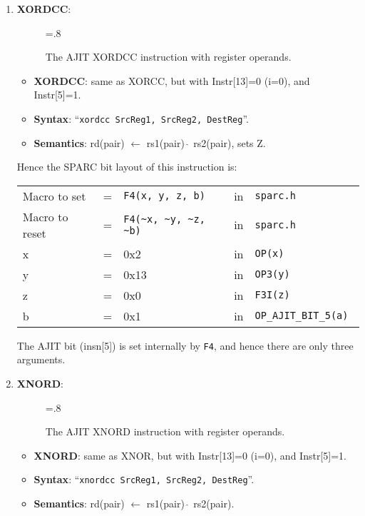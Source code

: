 \begin{enumerate}
\item \textbf{XORDCC}:\\
  \begin{center}
    \begin{figure}[h]
      \centering
      \epsfxsize=.8\linewidth
      \caption{The AJIT XORDCC instruction  with register operands.}
      \label{fig:ajit:xordcc:insn}
    \end{figure}
  \end{center}
  \begin{itemize}
  \item []\textbf{XORDCC}: same as XORCC, but with Instr[13]=0 (i=0), and
    Instr[5]=1.
  \item []\textbf{Syntax}: ``\texttt{xordcc  SrcReg1, SrcReg2, DestReg}''.
  \item []\textbf{Semantics}: rd(pair) $\leftarrow$ rs1(pair) $\hat{~}$
    rs2(pair), sets Z.
  \end{itemize}

  Hence the SPARC bit layout of this instruction is:

  \begin{tabular}[h]{lclcl}
    Macro to set   &=&  \verb|F4(x, y, z, b)|     &in& \verb|sparc.h|     \\
    Macro to reset &=&  \verb|F4(~x, ~y, ~z, ~b)| &in& \verb|sparc.h|     \\
    x              &=& 0x2                        &in& \verb|OP(x) | \\
    y              &=& 0x13                       &in& \verb|OP3(y) | \\
    z              &=& 0x0                        &in& \verb|F3I(z) | \\
    b              &=& 0x1                        &in& \verb|OP_AJIT_BIT_5(a) |
  \end{tabular}

  The AJIT bit  (insn[5]) is set internally by  \texttt{F4}, and hence
  there are only three arguments.

\item \textbf{XNORD}:\\
  \begin{center}
    \begin{figure}[h]
      \centering
      \epsfxsize=.8\linewidth
      \caption{The AJIT XNORD instruction  with register operands.}
      \label{fig:ajit:xnord:insn}
    \end{figure}
  \end{center}
  \begin{itemize}
  \item []\textbf{XNORD}: same as XNOR, but with Instr[13]=0 (i=0), and
    Instr[5]=1.
  \item []\textbf{Syntax}: ``\texttt{xnordcc  SrcReg1, SrcReg2, DestReg}''.
  \item []\textbf{Semantics}: rd(pair) $\leftarrow$ rs1(pair) $\hat{~}$
    rs2(pair).
  \end{itemize}


\end{enumerate}
